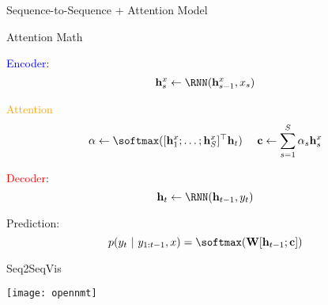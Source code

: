\begin{frame}{Sequence-to-Sequence + Attention Model}
  \vspace{-0.25cm}

  \begin{center}
  \end{center}
\end{frame}

\begin{frame}{Attention Math}

  \textcolor{blue}{Encoder}:
  \[{\mathbf{h}^{x}_s \gets \RNN(\mathbf{h}^{x}_{s-1}, x_s)} \]


  \textcolor{orange}{Attention}
  \[\alpha \gets  \softmax(   [\mathbf{h}^{x}_1 ; \ldots; \mathbf{h}^{x}_S]^\top \mathbf{h}_{t} ) \ \ \ \
  {\mathbf{c}} \gets \sum_{s =1}^S \alpha_s \mathbf{h}_s^{x}  \]

  \textcolor{red}{Decoder}:
  \[{\mathbf{h}_t \gets \RNN(\mathbf{h}_{t-1}, y_t)} \]

  Prediction:
  \[ p(y_{t}\  |\  y_{1:t-1}, x) = \softmax( \mathbf{W} [\mathbf{h}_{t-1}; \mathbf{c}]) \]

\end{frame}

\begin{frame}{Seq2SeqVis}
  \vspace{-0.25cm}

  \begin{center}
  \end{center}

\end{frame}


\begin{frame}

  \begin{center}
    \texttt{[image: opennmt]}
  \end{center}

\end{frame}

